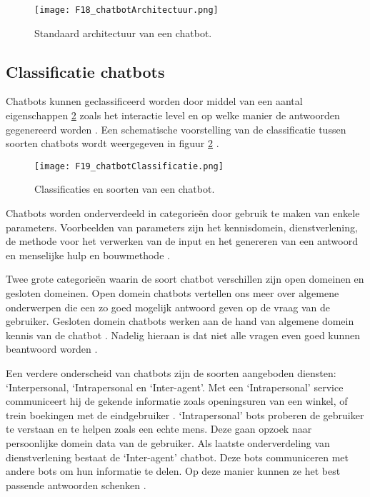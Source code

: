 \begin{figure}[h]
    \centering
    \texttt{[image: F18\_chatbotArchitectuur.png]}
    \captionsetup{justification=centering, singlelinecheck=false}    
    \caption{Standaard architectuur van een chatbot.}
    \label{fig:chatbotArchitectuur}
\end{figure}

\subsection{Classificatie chatbots}%
\label{sec:chatbotTypes}

Chatbots kunnen geclassificeerd worden door middel van een aantal eigenschappen \ref{fig:chatbotTypes} zoals het interactie level en op welke manier de antwoorden gegenereerd worden \autocite{Nimavat2017}.
Een schematische voorstelling van de classificatie tussen soorten chatbots wordt weergegeven in figuur \ref{fig:chatbotTypes} \autocite{Tamrakar2021}.


\begin{figure}[h]
    \centering
    \texttt{[image: F19\_chatbotClassificatie.png]}
    \captionsetup{justification=centering, singlelinecheck=false}   
    \caption{Classificaties en soorten van een chatbot.}
    \label{fig:chatbotTypes}
\end{figure}

Chatbots worden onderverdeeld in categorieën door gebruik te maken van enkele parameters. Voorbeelden van parameters zijn het kennisdomein, dienstverlening, de methode voor het verwerken van de input en het genereren van een antwoord en menselijke hulp en bouwmethode \autocite{Adamopoulou2020}. 

Twee grote categorieën waarin de soort chatbot verschillen zijn open domeinen en gesloten domeinen. Open domein chatbots vertellen ons meer over algemene onderwerpen die een zo goed mogelijk antwoord geven op de vraag van de gebruiker. Gesloten domein chatbots werken aan de hand van algemene domein kennis van de chatbot \autocite{Adamopoulou2020}. Nadelig hieraan is dat niet alle vragen even goed kunnen beantwoord worden \autocite{Kucherbaev2018}.

Een verdere onderscheid van chatbots zijn de soorten aangeboden diensten: ‘Interpersonal, ‘Intrapersonal en ‘Inter-agent’. Met een ‘Intrapersonal’ service communiceert hij de gekende informatie zoals openingsuren van een winkel, of trein boekingen met de eindgebruiker \autocite{Adamopoulou2020}. ‘Intrapersonal’ bots proberen de gebruiker te verstaan en te helpen zoals een echte mens. Deze gaan opzoek naar persoonlijke domein data van de gebruiker. Als laatste onderverdeling van dienstverlening bestaat de ‘Inter-agent’ chatbot. Deze bots communiceren met andere bots om hun informatie te delen. Op deze manier kunnen ze het best passende antwoorden schenken \autocite{Nimavat2017}.

